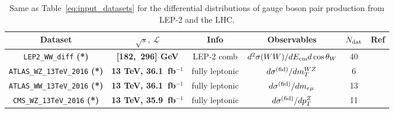 
\begin{table}[t]
  \centering
  \scriptsize
   \renewcommand{\arraystretch}{1.90}
  \begin{tabular}{c|c|c|c|c|c}
 Dataset   &  $\sqrt{s}, ~\mathcal{L}$ & Info  &  Observables  & $N_{\rm dat}$ & Ref   \\
    \toprule
        {\tt LEP2\_WW\_diff} {\bf (*)}   & {\bf [182,~296] GeV}   & LEP-2 comb   & $d^2\sigma(WW)/dE_{\rm cm}d\cos\theta_{W}$  & 40  &  \cite{Schael:2013ita} \\ \toprule
    {\tt ATLAS\_WZ\_13TeV\_2016} {\bf (*)}  & {\bf 13 TeV, 36.1~fb$^{-1}$}  &
    fully leptonic &  $d\sigma^{\rm (fid)}/dm_T^{WZ}$  &  6    & \cite{Aaboud:2019gxl}  \\
    \midrule
    {\tt ATLAS\_WW\_13TeV\_2016} {\bf (*)}  &{\bf 13 TeV, 36.1~fb$^{-1}$}  &
    fully leptonic &  $d\sigma^{\rm (fid)}/dm_{e\mu}$  &  13    &  \cite{Aaboud:2019nkz} \\
     \midrule
    {\tt CMS\_WZ\_13TeV\_2016} {\bf (*)}  & {\bf 13 TeV, 35.9~fb$^{-1}$}  &
    fully leptonic &  $d\sigma^{\rm (fid)}/dp_T^{Z}$  &  11    &  \cite{Sirunyan:2019bez} \\
    \bottomrule
    \end{tabular}
  \caption{\small Same as Table~\ref{eq:input_datasets} for
    the differential distributions of gauge boson pair
    production from LEP-2 and the LHC.
     \label{eq:input_datasets_diboson}
  }
\end{table}

